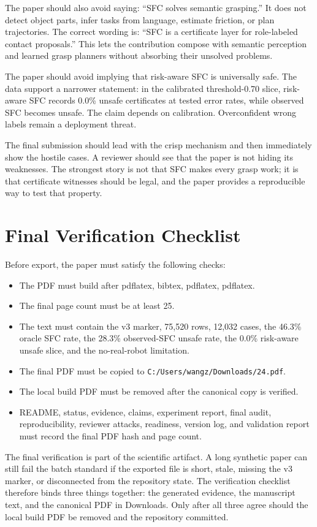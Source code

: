 \documentclass{article}
\begin{document}
The paper should also avoid saying: ``SFC solves semantic grasping.'' It does not detect object parts, infer tasks from language, estimate friction, or plan trajectories. The correct wording is: ``SFC is a certificate layer for role-labeled contact proposals.'' This lets the contribution compose with semantic perception and learned grasp planners without absorbing their unsolved problems.

The paper should avoid implying that risk-aware SFC is universally safe. The data support a narrower statement: in the calibrated threshold-0.70 slice, risk-aware SFC records 0.0\% unsafe certificates at tested error rates, while observed SFC becomes unsafe. The claim depends on calibration. Overconfident wrong labels remain a deployment threat.

The final submission should lead with the crisp mechanism and then immediately show the hostile cases. A reviewer should see that the paper is not hiding its weaknesses. The strongest story is not that SFC makes every grasp work; it is that certificate witnesses should be legal, and the paper provides a reproducible way to test that property.

\clearpage
\section{Final Verification Checklist}

Before export, the paper must satisfy the following checks:

\begin{itemize}
\item The PDF must build after pdflatex, bibtex, pdflatex, pdflatex.
\item The final page count must be at least 25.
\item The text must contain the v3 marker, 75,520 rows, 12,032 cases, the 46.3\% oracle SFC rate, the 28.3\% observed-SFC unsafe rate, the 0.0\% risk-aware unsafe slice, and the no-real-robot limitation.
\item The final PDF must be copied to \texttt{C:/Users/wangz/Downloads/24.pdf}.
\item The local build PDF must be removed after the canonical copy is verified.
\item README, status, evidence, claims, experiment report, final audit, reproducibility, reviewer attacks, readiness, version log, and validation report must record the final PDF hash and page count.
\end{itemize}

The final verification is part of the scientific artifact. A long synthetic paper can still fail the batch standard if the exported file is short, stale, missing the v3 marker, or disconnected from the repository state. The verification checklist therefore binds three things together: the generated evidence, the manuscript text, and the canonical PDF in Downloads. Only after all three agree should the local build PDF be removed and the repository committed.
\end{document}
